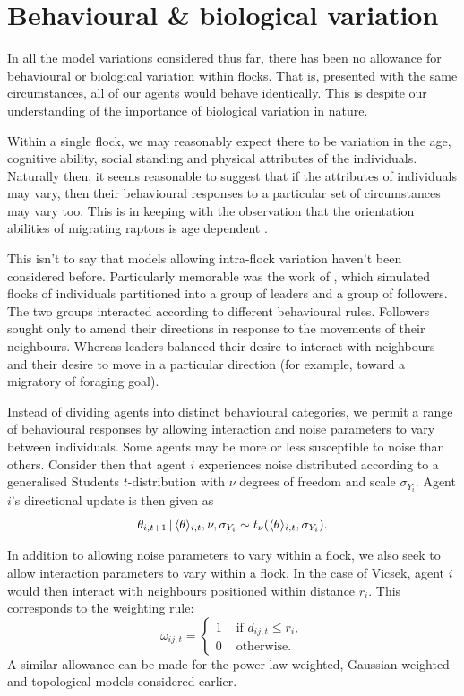 \section{Behavioural \& biological variation}

In all the model variations considered thus far, there has been no allowance for
behavioural or biological variation within flocks. That is, presented with the same
circumstances, all of our agents would behave identically. This is despite our
understanding of the importance of biological variation in nature.

Within a single flock, we may reasonably expect there to be variation in the age,
cognitive ability, social standing and physical attributes of the individuals. Naturally
then, it seems reasonable to suggest that if the attributes of individuals may vary, then
their behavioural responses to a particular set of circumstances may vary too.
This is in keeping with the observation that the orientation abilities of migrating
raptors is age dependent \parencite{thorup03}.

This isn't to say that models allowing intra-flock variation haven't been considered
before. Particularly memorable was the work of \textcite{couzin05}, which simulated flocks
of individuals partitioned into a group of leaders and a group of followers. The two groups
interacted according to different behavioural rules. Followers sought only to amend their
directions in response to the movements of their neighbours. Whereas leaders balanced
their desire to interact with neighbours and their desire to move in a particular
direction (for example, toward a migratory of foraging goal).

Instead of dividing agents into distinct behavioural categories, we permit a range of
behavioural responses by allowing interaction and noise parameters to vary between
individuals. Some agents may be more or less susceptible to noise than others. Consider
then that agent $i$ experiences noise distributed according to a generalised Students
$t$-distribution with $\nu$ degrees of freedom and scale $\sigma_{Y_i}$. Agent $i$'s
directional update is then given as
\begin{equation*}
    \theta_{i,t+1} \,|\, \langle\theta\rangle_{i,t}, \nu, \sigma_{Y_i} \sim
    t_{\nu}(\langle\theta\rangle_{i,t}, \sigma_{Y_i}).
\end{equation*}

In addition to allowing noise parameters to vary within a flock, we also seek to allow
interaction parameters to vary within a flock. In the case of Vicsek, agent $i$ would then
interact with neighbours positioned within distance $r_i$. This corresponds to the
weighting rule:
\begin{equation}
    \omega_{ij,t} =
    \begin{cases}
        1 & \text{ if } d_{ij, t} \leq r_i,\\
        0 & \text{ otherwise.}
    \end{cases}
\end{equation}
A similar allowance can be made for the power-law weighted, Gaussian weighted and
topological models considered earlier.

